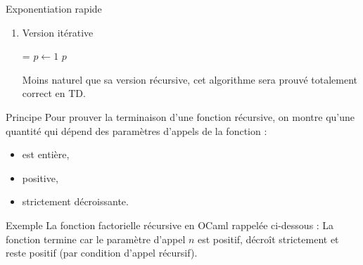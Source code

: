 \documentclass[10pt]{beamer}
\begin{document}
\begin{frame}[fragile]{\Ctitle}{\stitle}
	\begin{exampleblock}{Exponentiation rapide}
		\begin{enumerate}
			\addtocounter{enumi}{5}
			\item<1-> \textcolor{OliveGreen}{Version itérative}
			\begin{algorithm}[H]
				\DontPrintSemicolon
				\caption{Version itérative de l'exponentiation rapide}
				\everypar={\footnotesize \textcolor{gray}{\nl}}
				$p \leftarrow 1$\;
				\Return $p$
			  \end{algorithm}	
		Moins \og{}naturel\fg{} que sa version récursive, cet algorithme sera prouvé totalement correct en TD.
		\end{enumerate}
	\end{exampleblock}
\end{frame}

\begin{frame}[fragile]{\Ctitle}{\stitle}
	\begin{block}{Principe}
		Pour prouver la terminaison d'une fonction récursive, on montre qu'une quantité qui dépend des paramètres d'appels de la fonction :
		\begin{itemize}
		\item<2-> est entière,
		\item<3-> positive,
		\item<4-> strictement décroissante.
		\end{itemize}
	\end{block}
	{
		\begin{exampleblock}{Exemple}
			La fonction factorielle récursive en OCaml rappelée ci-dessous :
			La fonction termine car le paramètre d'appel $n$ est positif, décroît strictement et reste positif (par condition d'appel récursif).
		\end{exampleblock}
	}
\end{frame}
\end{document}
